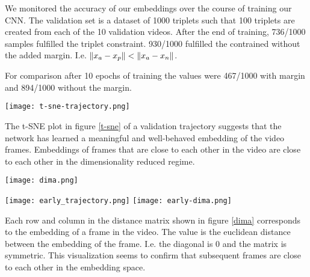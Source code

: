 
We monitored the accuracy of our embeddings over the course of training our CNN. The validation set is a dataset of 1000 triplets such that 100 triplets are created from each of the 10 validation videos. After the end of training, 736/1000 samples fulfilled the triplet constraint. 930/1000 fulfilled the contrained without the added margin. I.e. $\left\lVert x_a - x_p\right\rVert < \left\lVert x_a - x_n\right\rVert$.

For comparison after 10 epochs of training the values were 467/1000 with margin and 894/1000 without the margin.

{
    \centering
    \texttt{[image: t-sne-trajectory.png]}
    \label{t-sne}
    \vspace{0.25cm}
}

The t-SNE plot in figure \ref{t-sne} of a validation trajectory suggests that the network has learned a meaningful and well-behaved embedding of the video frames. Embeddings of frames that are close to each other in the video are close to each other in the dimensionality reduced regime.

{
    \centering
    \texttt{[image: dima.png]}
    \label{dima}
    \vspace{0.25cm}
}

{
    \centering
    \texttt{[image: early\_trajectory.png]}
    \label{early-t-sne}
    \vspace{0.25cm}
}
{
    \centering
    \texttt{[image: early-dima.png]}
    \label{early-dima}
    \vspace{0.25cm}
}

Each row and column in the distance matrix shown in figure \ref{dima} corresponds to the embedding of a frame in the video. The value is the euclidean distance between the embedding of the frame. I.e. the diagonal is 0 and the matrix is symmetric. This visualization seems to confirm that subsequent frames are close to each other in the embedding space.

